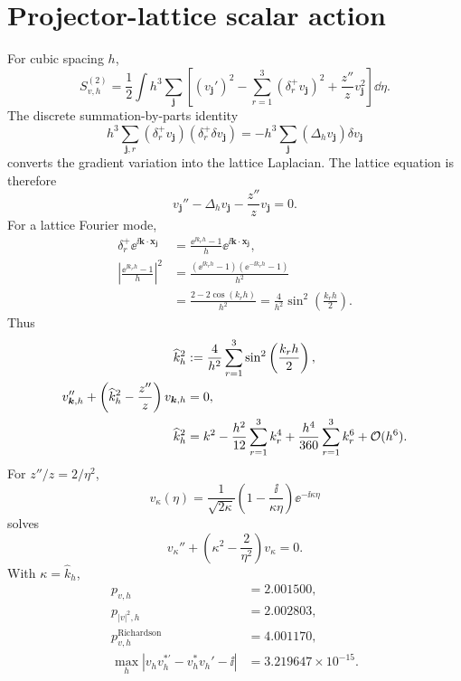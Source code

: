 \section{Projector-lattice scalar action}
For cubic spacing \(h\),
\begin{equation}
S_{v,h}^{(2)}
=\frac12\int h^3\sum_{\bm j}
\left[
(v_{\bm j}')^2
-\sum_{r=1}^3(\delta_r^+v_{\bm j})^2
+\frac{z''}{z}v_{\bm j}^2
\right]\dd\eta.
\end{equation}
The discrete summation-by-parts identity
\begin{equation}
h^3\sum_{\bm j,r}
(\delta_r^+v_{\bm j})(\delta_r^+\delta v_{\bm j})
=-h^3\sum_{\bm j}
(\Delta_hv_{\bm j})\delta v_{\bm j}
\end{equation}
converts the gradient variation into the lattice Laplacian.  The lattice equation is therefore
\begin{equation}
v_{\bm j}''-\Delta_hv_{\bm j}-\frac{z''}{z}v_{\bm j}=0.
\end{equation}
For a lattice Fourier mode,
\begin{align}
\delta_r^+\ee^{\ii\bm k\cdot\bm x_{\bm j}}
&=\frac{\ee^{\ii k_rh}-1}{h}
\ee^{\ii\bm k\cdot\bm x_{\bm j}},\\
\left|\frac{\ee^{\ii k_rh}-1}{h}\right|^2
&=\frac{(\ee^{\ii k_rh}-1)(\ee^{-\ii k_rh}-1)}{h^2}\\
&=\frac{2-2\cos(k_rh)}{h^2}
=\frac4{h^2}\sin^2\left(\frac{k_rh}{2}\right).
\end{align}
Thus
\begin{align}
\widehat k_h^2
&:=\frac4{h^2}\sum_{r=1}^3
\sin^2\left(\frac{k_rh}{2}\right),\\
v_{\bm k,h}''+
\left(\widehat k_h^2-\frac{z''}{z}\right)v_{\bm k,h}&=0,\\
\widehat k_h^2
&=k^2-\frac{h^2}{12}\sum_{r=1}^3k_r^4
+\frac{h^4}{360}\sum_{r=1}^3k_r^6
+\mathcal O(h^6).
\end{align}
For \(z''/z=2/\eta^2\),
\begin{equation}
v_\kappa(\eta)
=\frac{1}{\sqrt{2\kappa}}
\left(1-\frac{\ii}{\kappa\eta}\right)
\ee^{-\ii\kappa\eta}
\end{equation}
solves
\begin{equation}
v_\kappa''+
\left(\kappa^2-\frac2{\eta^2}\right)v_\kappa=0.
\end{equation}
With \(\kappa=\widehat k_h\),
\begin{align}
p_{v,h}&=2.001500,\\
p_{|v|^2,h}&=2.002803,\\
p_{v,h}^{\mathrm{Richardson}}&=4.001170,\\
\max_h
\left|v_hv_h^{*\prime}-v_h^*v_h'-\ii\right|
&=3.219647\times10^{-15}.
\end{align}

